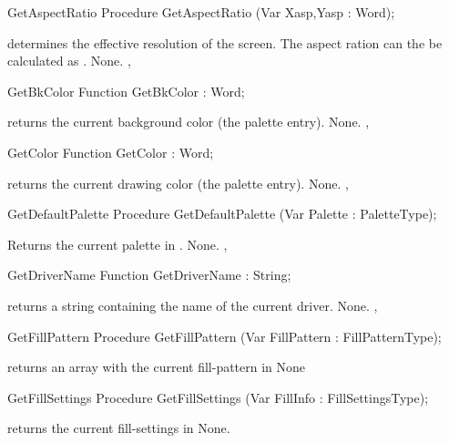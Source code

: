 \begin{procedure}{GetAspectRatio}
\Declaration
Procedure GetAspectRatio (Var Xasp,Yasp : Word);

\Description
{} determines the effective resolution of the screen. The aspect ration can
the be calculated as .
\Errors
None.
\SeeAlso
{},
\end{procedure}

\begin{function}{GetBkColor}
\Declaration
Function GetBkColor  : Word;

\Description
{} returns the current background color (the palette
entry).
\Errors
None.
\SeeAlso
{},
\end{function}

\begin{function}{GetColor}
\Declaration
Function GetColor  : Word;

\Description
{} returns the current drawing color (the palette
entry).
\Errors
None.
\SeeAlso
{},
\end{function}

\begin{procedure}{GetDefaultPalette}
\Declaration
Procedure GetDefaultPalette (Var Palette : PaletteType);

\Description
Returns the
current palette in .
\Errors
None.
\SeeAlso
{}, 
\end{procedure}

\begin{function}{GetDriverName}
\Declaration
Function GetDriverName  : String;

\Description
{} returns a string containing the name of the
current driver.
\Errors
None.
\SeeAlso
{}, 
\end{function}

\begin{procedure}{GetFillPattern}
\Declaration
Procedure GetFillPattern (Var FillPattern : FillPatternType);

\Description
{} returns an array with the current fill-pattern  in 
\Errors
None
\SeeAlso
{}
\end{procedure}

\begin{procedure}{GetFillSettings}
\Declaration
Procedure GetFillSettings (Var FillInfo : FillSettingsType);

\Description
{} returns the current fill-settings in
\Errors
None.
\SeeAlso
{}
\end{procedure}


